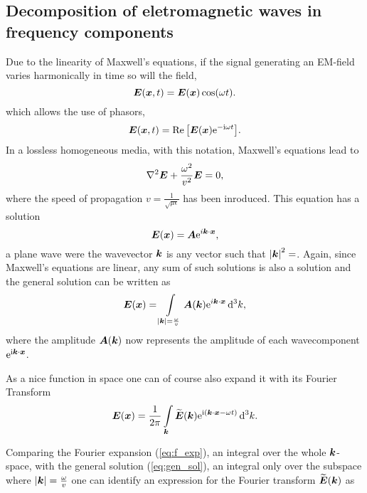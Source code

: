 \documentclass[11pt,a4paper, 
english, swedish %
]{article}
\begin{document}
\subsection{Decomposition of eletromagnetic waves in frequency components}

Due to the linearity of Maxwell's equations, if the signal generating an EM-field varies harmonically in time so will the field,
\begin{equation*}
\vb*E(\vb*x,t)=\vb*E(\vb*x)\cos(\omega t).
\end{equation*}
which allows the use of phasors,
\begin{equation*}
\vb*E(\vb*x,t)=\Re\qty[\vb*E(\vb*x)\mathrm{e}^{-\mathrm{i}\omega t}].
\end{equation*}
In a lossless homogeneous media, with this notation, Maxwell's equations lead to
\begin{equation}
  \label{eq:wave_free}
  \laplacian  \vb*E + \frac{\omega^2}{v^2}\vb*E=0,
\end{equation} 
where the speed of propagation $v=\frac{1}{\sqrt{\mu \epsilon}}$ has been inroduced. This equation has a solution
\begin{equation*}
\vb*E(\vb*x)=\vb*A\mathrm{e}^{i\vb*k \cdot \vb*x},
\end{equation*}
a plane wave were the wavevector $\vb*k$ is any vector such that $\abs{\vb*k}^2=$. Again, since Maxwell's equations are linear, any sum of such solutions is also a solution and the general solution can be written as
\begin{equation}
  \label{eq:gen_sol}
  \vb*E(\vb*x)=\int_{\abs{\vb*k}=\frac{\omega}{v}}\vb*A(\vb*k)\ee^{i\vb*k\cdot\vb*x}\id^3k,
\end{equation}
where the amplitude $\vb*A(\vb*k)$ now represents the amplitude of each wavecomponent $\mathrm{e}^{\mathrm{i}\vb*k \cdot \vb*x}$.

As a nice function in space one can of course also expand it with its Fourier Transform
\begin{equation}
  \label{eq:f_exp}
  \vb*E(\vb*x)=\frac{1}{2\pi}\int_{\vb*k} \widetilde{\vb*E}(\vb*k) \ee^{\ii(\vb*k\cdot\vb*x - \omega t)}\id^3k.
\end{equation}


Comparing the Fourier expansion (\ref{eq:f_exp}), an integral over the whole $\vb*k$-space, with the general solution (\ref{eq:gen_sol}), an integral only over the subspace where $\abs{\vb*k}=\frac{\omega}{v}$ one can identify an expression for the Fourier transform $\widetilde{\vb*E}(\vb*k)$ as
\end{document}
